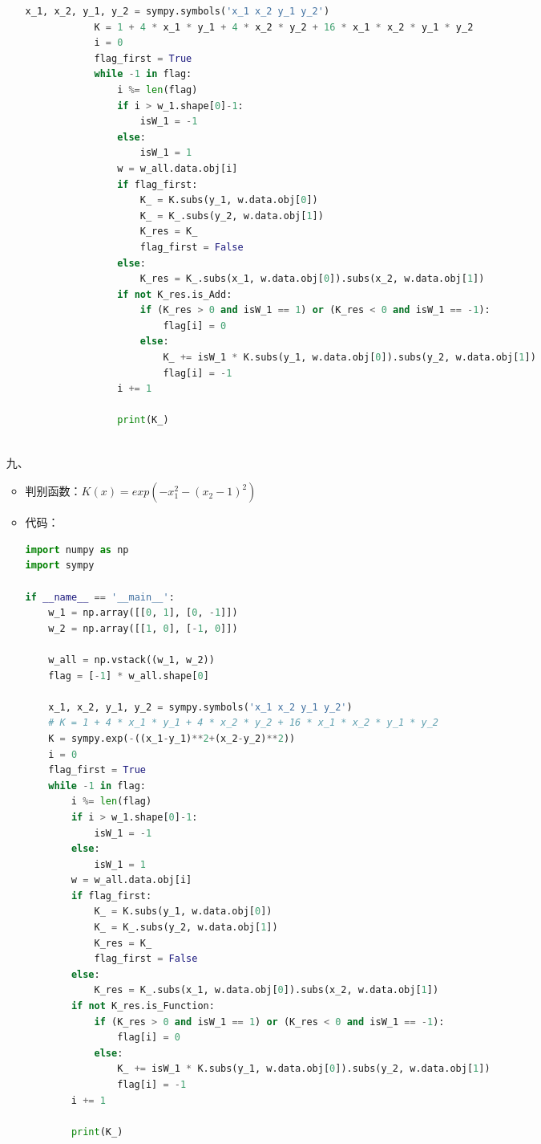 \documentclass[UTF8,a4paper]{ctexart}
\begin{document}
\begin{itemize}
\begin{itemize}
\begin{lstlisting}[language={Python}]
            x_1, x_2, y_1, y_2 = sympy.symbols('x_1 x_2 y_1 y_2')
            K = 1 + 4 * x_1 * y_1 + 4 * x_2 * y_2 + 16 * x_1 * x_2 * y_1 * y_2
            i = 0
            flag_first = True
            while -1 in flag:
                i %= len(flag)
                if i > w_1.shape[0]-1:
                    isW_1 = -1
                else:
                    isW_1 = 1
                w = w_all.data.obj[i]
                if flag_first:
                    K_ = K.subs(y_1, w.data.obj[0])
                    K_ = K_.subs(y_2, w.data.obj[1])
                    K_res = K_
                    flag_first = False
                else:
                    K_res = K_.subs(x_1, w.data.obj[0]).subs(x_2, w.data.obj[1])
                if not K_res.is_Add:
                    if (K_res > 0 and isW_1 == 1) or (K_res < 0 and isW_1 == -1):
                        flag[i] = 0
                    else:
                        K_ += isW_1 * K.subs(y_1, w.data.obj[0]).subs(y_2, w.data.obj[1])
                        flag[i] = -1
                i += 1
        
                print(K_)
        
    \end{lstlisting}
\end{itemize}
\item[九、] 
\begin{itemize}
    \item 判别函数：$K(x) =exp(-x_1^2 - (x_2 - 1)^2)$
    \item 代码：
    \begin{lstlisting}[language={Python}]
import numpy as np
import sympy

if __name__ == '__main__':
    w_1 = np.array([[0, 1], [0, -1]])
    w_2 = np.array([[1, 0], [-1, 0]])

    w_all = np.vstack((w_1, w_2))
    flag = [-1] * w_all.shape[0]

    x_1, x_2, y_1, y_2 = sympy.symbols('x_1 x_2 y_1 y_2')
    # K = 1 + 4 * x_1 * y_1 + 4 * x_2 * y_2 + 16 * x_1 * x_2 * y_1 * y_2
    K = sympy.exp(-((x_1-y_1)**2+(x_2-y_2)**2))
    i = 0
    flag_first = True
    while -1 in flag:
        i %= len(flag)
        if i > w_1.shape[0]-1:
            isW_1 = -1
        else:
            isW_1 = 1
        w = w_all.data.obj[i]
        if flag_first:
            K_ = K.subs(y_1, w.data.obj[0])
            K_ = K_.subs(y_2, w.data.obj[1])
            K_res = K_
            flag_first = False
        else:
            K_res = K_.subs(x_1, w.data.obj[0]).subs(x_2, w.data.obj[1])
        if not K_res.is_Function:
            if (K_res > 0 and isW_1 == 1) or (K_res < 0 and isW_1 == -1):
                flag[i] = 0
            else:
                K_ += isW_1 * K.subs(y_1, w.data.obj[0]).subs(y_2, w.data.obj[1])
                flag[i] = -1
        i += 1

        print(K_)

        
    \end{lstlisting}
\end{itemize}
\end{itemize}
\end{document}
